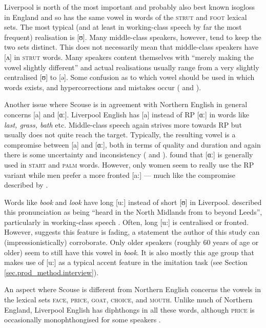 Liverpool is north of the most important and probably also best known isogloss in England and so has the same vowel in words of the \textsc{strut} and \textsc{foot} lexical sets.
The most typical (and at least in working-class speech by far the most frequent) realisation is [ʊ].
Many middle-class speakers, however, tend to keep the two sets distinct.
This does not necessarily mean that middle-class speakers have [ʌ] in \textsc{strut} words.
Many speakers content themselves with ``merely making the vowel slightly different'' \citep[284]{knowles1973} and actual realisations usually range from a very slightly centralised [ʊ] to [ə].
Some confusion as to which vowel should be used in which words exists, and hypercorrections and mistakes occur (\citealt[286--287]{knowles1973} and \citealt[83]{knowles1978}).

Another issue where Scouse is in agreement with Northern English in general concerns [a] and [ɑː].
Liverpool English has [a] instead of RP [ɑː] in words like \emph{last, grass, bath} etc.
Middle-class speech again strives more towards RP but usually does not quite reach the target.
Typically, the resulting vowel is a compromise between [a] and [ɑː], both in terms of quality and duration and again there is some uncertainty and inconsistency (\citealp[cf.][287--289]{knowles1973} and \citeyear[83--84]{knowles1978}).
\citeauthor{watson2007} found that [ɑː] is generally used in \textsc{start} and \textsc{palm} words.
However, only women seem to really use the RP variant while men prefer a more fronted [a:] \parencite[cf.][358]{watson2007} --- much like the compromise described by \cite{knowles1973}.

Words like \emph{book} and \emph{look} have long [u:] instead of short [ʊ] in Liverpool.
\citet{knowles1973} described this pronunciation as being ``heard in the North Midlands from  to beyond Leeds'', particularly in working-class speech \citep[290]{knowles1973}.
Often, long [u:] is centralised or fronted.
However, \citet[358]{watson2007} suggests this feature is fading, a statement the author of this study can (impressionistically) corroborate.
Only older speakers (roughly 60 years of age or older) seem to still have this vowel in \emph{book}.
It is also mostly this age group that makes use of [u:] as a typical accent feature in the imitation task (see Section \ref{sec.prod_method.interview}).

An aspect where Scouse is different from Northern English concerns the vowels in the lexical sets \textsc{face}, \textsc{price}, \textsc{goat}, \textsc{choice}, and \textsc{mouth}.
Unlike much of Northern England, Liverpool English has diphthongs in all these words, although \textsc{price} is occasionally monophthongised for some speakers \citep[cf.][358]{watson2007}.

